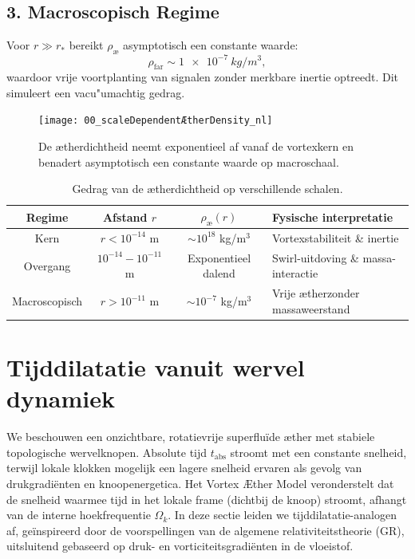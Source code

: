\subsection*{3. Macroscopisch Regime}

Voor \( r \gg r_* \) bereikt \( \rho_\text{\ae} \) asymptotisch een constante waarde:
\begin{equation}
    \rho_\text{far} \sim \SI{1e-7}{kg/m^3},
\end{equation}
waardoor vrije voortplanting van signalen zonder merkbare inertie optreedt. Dit simuleert een vacu"umachtig gedrag.


\begin{figure}[htbp]
    \centering
    \texttt{[image: 00\_scaleDependentÆtherDensity\_nl]}
    \caption{De ætherdichtheid neemt exponentieel af vanaf de vortexkern en benadert asymptotisch een constante waarde op macroschaal.}
    \label{fig:vortexfields2}
\end{figure}

\begin{table}[h!]
    \centering
    \begin{tabular}{|c|c|c|l|}
        \hline
        Regime & Afstand $r$ & $\rho_\text{\ae}(r)$ & Fysische interpretatie \\
        \hline
        Kern & $r < 10^{-14}$ m & $\sim 10^{18}$ kg/m$^3$ & Vortexstabiliteit \& inertie \\
        Overgang & $10^{-14} - 10^{-11}$ m & Exponentieel dalend & Swirl-uitdoving \& massa-interactie \\
        Macroscopisch & $r > 10^{-11}$ m & $\sim 10^{-7}$ kg/m$^3$ & Vrije ætherzonder massaweerstand \\
        \hline
    \end{tabular}
    \caption{Gedrag van de ætherdichtheid op verschillende schalen.}
\end{table}


\section{Tijddilatatie vanuit wervel dynamiek}

We beschouwen een onzichtbare, rotatievrije superfluïde æther met stabiele topologische wervelknopen. Absolute tijd $t_\text{abs}$ stroomt met een constante snelheid, terwijl lokale klokken mogelijk een lagere snelheid ervaren als gevolg van drukgradiënten en knoopenergetica. Het Vortex Æther Model veronderstelt dat de snelheid waarmee tijd in het lokale frame (dichtbij de knoop) stroomt, afhangt van de interne hoekfrequentie $\Omega_k$. In deze sectie leiden we tijddilatatie-analogen af, geïnspireerd door de voorspellingen van de algemene relativiteitstheorie (GR), uitsluitend gebaseerd op druk- en vorticiteitsgradiënten in de vloeistof.

